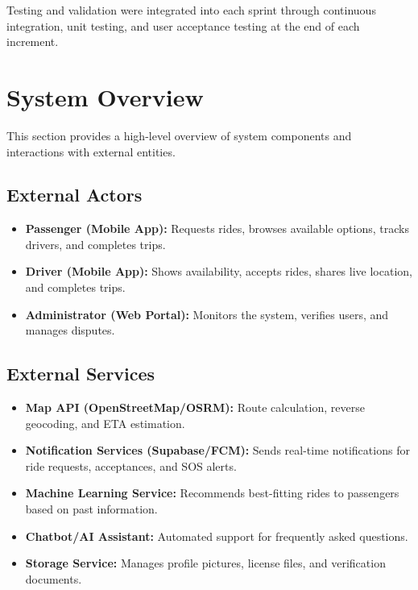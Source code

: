 Testing and validation were integrated into each sprint through continuous integration, unit testing, and user acceptance testing at the end of each increment.

\section{System Overview}

This section provides a high-level overview of system components and interactions with external entities.

\subsection{External Actors}

\begin{itemize}
    \item \textbf{Passenger (Mobile App):} Requests rides, browses available options, tracks drivers, and completes trips.
    \item \textbf{Driver (Mobile App):} Shows availability, accepts rides, shares live location, and completes trips.
    \item \textbf{Administrator (Web Portal):} Monitors the system, verifies users, and manages disputes.
\end{itemize}

\subsection{External Services}

\begin{itemize}
    \item \textbf{Map API (OpenStreetMap/OSRM):} Route calculation, reverse geocoding, and ETA estimation.
    \item \textbf{Notification Services (Supabase/FCM):} Sends real-time notifications for ride requests, acceptances, and SOS alerts.
    \item \textbf{Machine Learning Service:} Recommends best-fitting rides to passengers based on past information.
    \item \textbf{Chatbot/AI Assistant:} Automated support for frequently asked questions.
    \item \textbf{Storage Service:} Manages profile pictures, license files, and verification documents.
\end{itemize}

